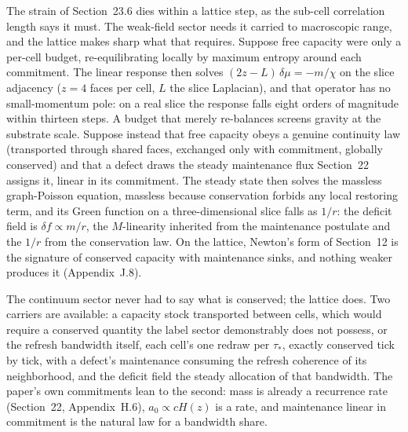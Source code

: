 \documentclass[11pt]{article}
\begin{document}
The strain of Section~23.6 dies within a lattice step, as the sub-cell correlation length says it must. The weak-field sector needs it carried to macroscopic range, and the lattice makes sharp what that requires. Suppose free capacity were only a per-cell budget, re-equilibrating locally by maximum entropy around each commitment. The linear response then solves $(2z-L)\,\delta\mu=-m/\chi$ on the slice adjacency ($z=4$ faces per cell, $L$ the slice Laplacian), and that operator has no small-momentum pole: on a real slice the response falls eight orders of magnitude within thirteen steps. A budget that merely re-balances screens gravity at the substrate scale. Suppose instead that free capacity obeys a genuine continuity law (transported through shared faces, exchanged only with commitment, globally conserved) and that a defect draws the steady maintenance flux Section~22 assigns it, linear in its commitment. The steady state then solves the massless graph-Poisson equation, massless because conservation forbids any local restoring term, and its Green function on a three-dimensional slice falls as $1/r$: the deficit field is $\delta f\propto m/r$, the $M$-linearity inherited from the maintenance postulate and the $1/r$ from the conservation law. On the lattice, Newton's form of Section~12 is the signature of conserved capacity with maintenance sinks, and nothing weaker produces it (Appendix~J.8).

The continuum sector never had to say what is conserved; the lattice does. Two carriers are available: a capacity stock transported between cells, which would require a conserved quantity the label sector demonstrably does not possess, or the refresh bandwidth itself, each cell's one redraw per $\tau_*$, exactly conserved tick by tick, with a defect's maintenance consuming the refresh coherence of its neighborhood, and the deficit field the steady allocation of that bandwidth. The paper's own commitments lean to the second: mass is already a recurrence rate (Section~22, Appendix~H.6), $a_0\propto cH(z)$ is a rate, and maintenance linear in commitment is the natural law for a bandwidth share.
\end{document}
